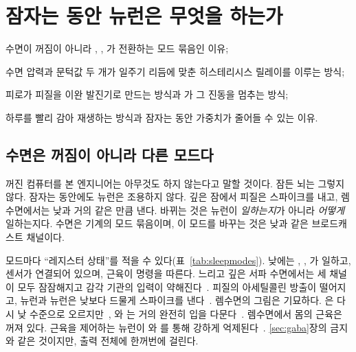 \chapter{잠자는 동안 뉴런은 무엇을 하는가}
\label{sec:sleep}
\begin{chaptergoals}
\item 수면이 꺼짐이 아니라 , , 가 전환하는 모드 묶음인 이유;
\item 수면 압력과 문턱값 두 개가 일주기 리듬에 맞춘 히스테리시스 릴레이를 이루는 방식;
\item 피로가 피질을 이완 발진기로 만드는 방식과 가 그 진동을 멈추는 방식;
\item 하루를 빨리 감아 재생하는 방식과 잠자는 동안 가중치가 줄어들 수 있는 이유.
\end{chaptergoals}

\section{수면은 꺼짐이 아니라 다른 모드다}

꺼진 컴퓨터를 본 엔지니어는 아무것도 하지 않는다고 말할 것이다. 잠든 뇌는 그렇지 않다. 잠자는 동안에도 뉴런은 조용하지 않다. 깊은 잠에서 피질은 스파이크를 내고, 렘수면에서는 낮과 거의 같은 만큼 낸다. 바뀌는 것은 뉴런이 \emph{일하는지}가 아니라 \emph{어떻게} 일하는지다. 수면은 기계의 모드 묶음이며, 이 모드를 바꾸는 것은 낮과 같은 브로드캐스트 채널이다.

모드마다 “레지스터 상태”를 적을 수 있다(표~\ref{tab:sleepmodes}). 낮에는 , , 가 일하고, 센서가 연결되어 있으며, 근육이 명령을 따른다. 느리고 깊은 서파 수면에서는 세 채널이 모두 잠잠해지고 감각 기관의 입력이 약해진다~\cite{Hasselmo1999}. 피질의 아세틸콜린 방출이 떨어지고,  뉴런과  뉴런은 낮보다 드물게 스파이크를 낸다~\cite{Marrosu1995,AstonJonesBloom1981,McGintyHarper1976}. 렘수면의 그림은 기묘하다. 은 다시 낮 수준으로 오르지만~\cite{Marrosu1995}, 와 는 거의 완전히 입을 다문다~\cite{AstonJonesBloom1981,McGintyHarper1976,JacobsAzmitia1992}. 렘수면에서 몸의 근육은 꺼져 있다. 근육을 제어하는  뉴런이 와 를 통해 강하게 억제된다~\cite{BrooksPeever2012}. \ref{sec:gaba}장의 금지와 같은 것이지만, 출력 전체에 한꺼번에 걸린다.

